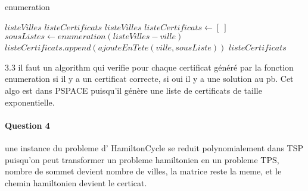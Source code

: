 \documentclass[a4paper,10pt]{article}
\begin{document}
\begin{algorithm}
\caption{enumeration}
\begin{algorithmic}
\REQUIRE $listeVilles$
\ENSURE $listeCertificats$
  \RETURN $listeVilles$
\ENDIF
\STATE $listeCertificats \leftarrow [~]$
  \STATE $sousListes \leftarrow enumeration(listeVilles - ville)$
    \STATE $listeCertificats.append(ajouteEnTete(ville,sousListe)) $
  \ENDFOR
\ENDFOR
\RETURN $listeCertificats$
\end{algorithmic}
\end{algorithm}

3.3 il faut un algorithm qui verifie pour chaque certificat généré par la fonction enumeration si il y a un
certificat correcte, si oui il y a une solution au pb. Cet algo est dans PSPACE puisqu'il génère une liste de certificats de taille exponentielle.

\paragraph{Question 4}
une instance du probleme d' HamiltonCycle se reduit polynomialement dans TSP puisqu'on peut transformer un probleme hamiltonien en un probleme TPS,
nombre de sommet devient nombre de villes, la matrice reste la meme, et le chemin hamiltonien devient le certicat.
\end{document}
